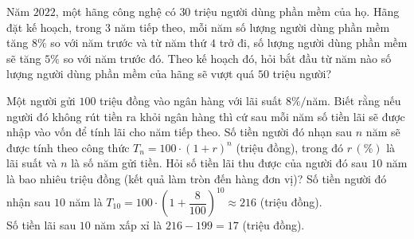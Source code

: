 \begin{bt}%

	Năm $2022$, một hãng công nghệ có $30$ triệu người dùng phần mềm của họ. Hãng đặt kế hoạch, trong $3$ năm tiếp theo, mỗi năm số lượng người dùng phần mềm tăng $8\%$ so với năm trước và từ năm thứ $4$ trở đi, số lượng người dùng phần mềm sẽ tăng $5\%$ so với năm trước đó. Theo kế hoạch đó, hỏi bắt đầu từ năm nào số lượng người dùng phần mềm của hãng sẽ vượt quá $50$ triệu người?
\end{bt}

\begin{bt}%

	Một người gửi $100$ triệu đồng vào ngân hàng với lãi suất $8\%/$năm. Biết rằng nếu người đó không rút tiền ra khỏi ngân hàng thì cứ sau mỗi năm số tiền lãi sẽ được nhập vào vốn để tính lãi cho năm tiếp theo. Số tiền người đó nhạn sau $n$ năm sẽ được tính theo công thức $T_n=100\cdot (1+r)^{n}$ (triệu đồng), trong đó $r\,(\%)$ là lãi suất và $n$ là số năm gửi tiền.
	Hỏi số tiền lãi thu được của người đó sau $10$ năm là bao nhiêu triệu đồng (kết quả làm tròn đến hàng đơn vị)?
	\loigiai
	{
		Số tiền người đó nhận sau $10$ năm là $T_{10}=100\cdot\left (1+\dfrac{8}{100} \right )^{10}\approx 216$ (triệu đồng).\\
		Số tiền lãi sau $10$ năm xấp xỉ là $216-199=17$ (triệu đồng).
	} 
\end{bt}

